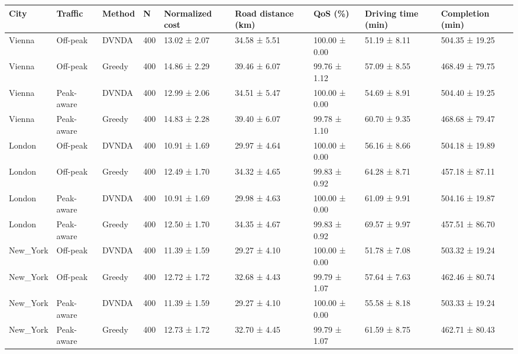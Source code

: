 \begin{tabular}{lllllllll}
\hline
City & Traffic & Method & N & Normalized cost & Road distance (km) & QoS (\%) & Driving time (min) & Completion (min) \\
\hline
Vienna & Off-peak & DVNDA & 400 & 13.02 ± 2.07 & 34.58 ± 5.51 & 100.00 ± 0.00 & 51.19 ± 8.11 & 504.35 ± 19.25 \\
Vienna & Off-peak & Greedy & 400 & 14.86 ± 2.29 & 39.46 ± 6.07 & 99.76 ± 1.12 & 57.09 ± 8.55 & 468.49 ± 79.75 \\
Vienna & Peak-aware & DVNDA & 400 & 12.99 ± 2.06 & 34.51 ± 5.47 & 100.00 ± 0.00 & 54.69 ± 8.91 & 504.40 ± 19.25 \\
Vienna & Peak-aware & Greedy & 400 & 14.83 ± 2.28 & 39.40 ± 6.07 & 99.78 ± 1.10 & 60.70 ± 9.35 & 468.68 ± 79.47 \\
London & Off-peak & DVNDA & 400 & 10.91 ± 1.69 & 29.97 ± 4.64 & 100.00 ± 0.00 & 56.16 ± 8.66 & 504.18 ± 19.89 \\
London & Off-peak & Greedy & 400 & 12.49 ± 1.70 & 34.32 ± 4.65 & 99.83 ± 0.92 & 64.28 ± 8.71 & 457.18 ± 87.11 \\
London & Peak-aware & DVNDA & 400 & 10.91 ± 1.69 & 29.98 ± 4.63 & 100.00 ± 0.00 & 61.09 ± 9.91 & 504.16 ± 19.87 \\
London & Peak-aware & Greedy & 400 & 12.50 ± 1.70 & 34.35 ± 4.67 & 99.83 ± 0.92 & 69.57 ± 9.97 & 457.51 ± 86.70 \\
New\_York & Off-peak & DVNDA & 400 & 11.39 ± 1.59 & 29.27 ± 4.10 & 100.00 ± 0.00 & 51.78 ± 7.08 & 503.32 ± 19.24 \\
New\_York & Off-peak & Greedy & 400 & 12.72 ± 1.72 & 32.68 ± 4.43 & 99.79 ± 1.07 & 57.64 ± 7.63 & 462.46 ± 80.74 \\
New\_York & Peak-aware & DVNDA & 400 & 11.39 ± 1.59 & 29.27 ± 4.10 & 100.00 ± 0.00 & 55.58 ± 8.18 & 503.33 ± 19.24 \\
New\_York & Peak-aware & Greedy & 400 & 12.73 ± 1.72 & 32.70 ± 4.45 & 99.79 ± 1.07 & 61.59 ± 8.75 & 462.71 ± 80.43 \\
\hline
\end{tabular}
